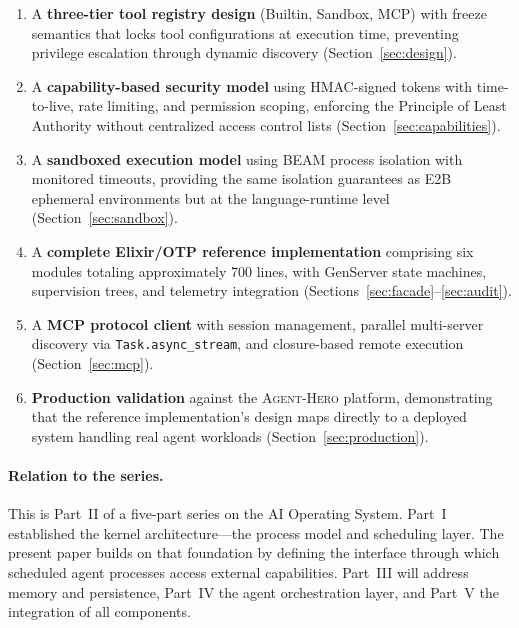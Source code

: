 \documentclass[12pt,a4paper]{article}
\theoremstyle{plain}
\theoremstyle{definition}
\newcommand{\agenthero}{\textsc{Agent-Hero}}
\begin{document}
\begin{enumerate}[leftmargin=2em]
\item A \textbf{three-tier tool registry design} (Builtin, Sandbox, MCP) with freeze semantics that locks tool configurations at execution time, preventing privilege escalation through dynamic discovery (Section~\ref{sec:design}).

\item A \textbf{capability-based security model} using HMAC-signed tokens with time-to-live, rate limiting, and permission scoping, enforcing the Principle of Least Authority without centralized access control lists (Section~\ref{sec:capabilities}).

\item A \textbf{sandboxed execution model} using BEAM process isolation with monitored timeouts, providing the same isolation guarantees as E2B ephemeral environments but at the language-runtime level (Section~\ref{sec:sandbox}).

\item A \textbf{complete Elixir/OTP reference implementation} comprising six modules totaling approximately 700 lines, with GenServer state machines, supervision trees, and telemetry integration (Sections~\ref{sec:facade}--\ref{sec:audit}).

\item A \textbf{MCP protocol client} with session management, parallel multi-server discovery via \texttt{Task.async\_stream}, and closure-based remote execution (Section~\ref{sec:mcp}).

\item \textbf{Production validation} against the \agenthero{} platform, demonstrating that the reference implementation's design maps directly to a deployed system handling real agent workloads (Section~\ref{sec:production}).
\end{enumerate}

\paragraph{Relation to the series.} This is Part~II of a five-part series on the AI Operating System. Part~I~\citep{longyoneda2026kernel} established the kernel architecture---the process model and scheduling layer. The present paper builds on that foundation by defining the interface through which scheduled agent processes access external capabilities. Part~III will address memory and persistence, Part~IV the agent orchestration layer, and Part~V the integration of all components.
\end{document}

